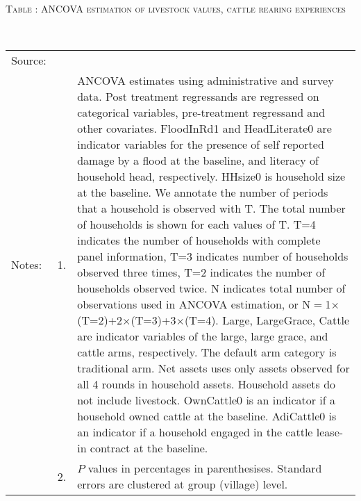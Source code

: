 \hspace{-1cm}\begin{minipage}[t]{14cm}
\hfil\textsc{\normalsize Table \thetable: ANCOVA estimation of livestock values, cattle rearing experiences\label{tab ANCOVA net assets experience}}\\
\setlength{\tabcolsep}{1pt}
\setlength{\baselineskip}{8pt}
\renewcommand{\arraystretch}{.52}
\hfil{}\\
\renewcommand{\arraystretch}{.8}
\setlength{\tabcolsep}{1pt}
\begin{tabular}{>{\hfill\scriptsize}p{1cm}<{}>{\hfill\scriptsize}p{.25cm}<{}>{\scriptsize}p{12cm}<{\hfill}}
Source:& \multicolumn{2}{l}{\scriptsize Estimated with GUK administrative and survey data.}\\
Notes: & 1. & ANCOVA estimates using administrative and survey data. Post treatment regressands are regressed on categorical variables, pre-treatment regressand and other covariates. \textsf{FloodInRd1} and \textsf{HeadLiterate0} are indicator variables for the presence of self reported damage by a flood at the baseline, and literacy of household head, respectively. \textsf{HHsize0} is household size at the baseline. We annotate the number of periods that a household is observed with \textsf{T}. The total number of households is shown for each values of \textsf{T}. \textsf{T=4} indicates the number of households with complete panel information, \textsf{T=3} indicates number of households observed three times, \textsf{T=2} indicates the number of households observed twice. \textsf{N} indicates total number of observations used in ANCOVA estimation, or \textsf{N$=$1$\times$(T=2)+2$\times$(T=3)+3$\times$(T=4)}.  \textsf{Large}, \textsf{LargeGrace}, \textsf{Cattle} are indicator variables of the \textsf{large}, \textsf{large grace}, and \textsf{cattle} arms, respectively. The default arm category is \textsf{traditional} arm. Net assets uses only assets observed for all 4 rounds in household assets. Household assets do not include livestock. \textsf{OwnCattle0} is an indicator if a household owned cattle at the baseline. \textsf{AdiCattle0} is an indicator if a household engaged in the cattle lease-in contract at the baseline.  \\
& 2. & $P$ values in percentages in parenthesises. Standard errors are clustered at group (village) level.
\end{tabular}
\end{minipage}

